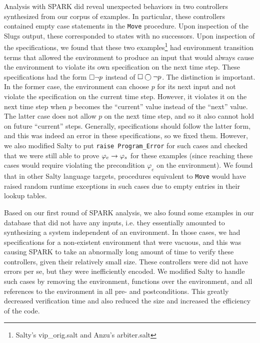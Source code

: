 \documentclass[runningheads]{llncs}
\begin{document}
Analysis with SPARK did reveal unexpected behaviors in two controllers synthesized from our corpus of examples. 
In particular, these controllers contained empty case statements in the \lstinline{Move} procedure. 
Upon inspection of the Slugs output, these corresponded to states with no successors. 
Upon inspection of the specifications, we found that these two examples\footnote{Salty's vip\_orig.salt and Anzu's arbiter.salt} had 
environment transition terms that allowed the environment to produce an input that would always cause 
the environment to violate its own specification on the next time step. 
These specifications had the form $\square \lnot p$ instead of $\square \varbigcirc \lnot p$. 
The distinction is important. 
In the former case, the environment can choose $p$ for its next input and not violate the specification on the current time step. 
However, it violates it on the next time step when $p$ becomes the ``current'' value instead of the ``next'' value. 
The latter case does not allow $p$ on the next time step, and so it also cannot hold on future ``current'' steps. 
Generally, specifications should follow the latter form, 
and this was indeed an error in these specifications, so we fixed them.
However, we also modified Salty to put \lstinline{raise Program_Error} for such cases and checked 
that we were still able to prove $\varphi_e \rightarrow \varphi_s$ for these examples  
(since reaching these cases would require violating the precondition $\varphi_e$ on the environment). 
We found that in other Salty language targets, procedures equivalent to \lstinline{Move} would have raised random runtime exceptions 
in such cases due to empty entries in their lookup tables.

Based on our first round of SPARK analysis, we also found some examples in our database that did not have any inputs, 
i.e. they essentially amounted to synthesizing a system independent of an environment. 
In those cases, we had specifications for a non-existent environment that were vacuous, 
and this was causing SPARK to take an abnormally long amount of time to verify these controllers, given their relatively small size. 
These controllers were did not have errors per se, 
but they were inefficiently encoded. 
We modified Salty to handle such cases by removing the environment, functions over the environment, and
all references to the environment in all pre- and postconditions.
This greatly decreased verification time and also reduced the size and increased the efficiency of the code.

\end{document}
